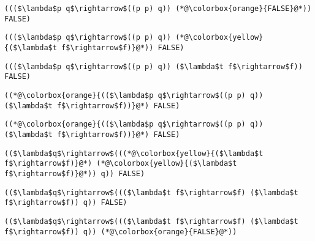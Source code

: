 \documentclass{beamer}
\begin{document}
\begin{frame}[fragile]{\CurrentSection}
\lstset{basicstyle=\ttfamily\small}\lstset{numbers=none}\lstset{language=ML}\begin{lstlisting}
((($\lambda$p q$\rightarrow$((p p) q)) (*@\colorbox{orange}{FALSE}@*)) FALSE)
\end{lstlisting}
\pause\lstset{language=ML}\begin{lstlisting}
((($\lambda$p q$\rightarrow$((p p) q)) (*@\colorbox{yellow}{($\lambda$t f$\rightarrow$f)}@*)) FALSE)
\end{lstlisting}

\end{frame}

\begin{frame}[fragile]{\CurrentSection}
\lstset{basicstyle=\ttfamily\small}\lstset{numbers=none}\lstset{language=ML}\begin{lstlisting}
((($\lambda$p q$\rightarrow$((p p) q)) ($\lambda$t f$\rightarrow$f)) FALSE)
\end{lstlisting}
\pause\lstset{language=ML}\begin{lstlisting}
((*@\colorbox{orange}{(($\lambda$p q$\rightarrow$((p p) q)) ($\lambda$t f$\rightarrow$f))}@*) FALSE)
\end{lstlisting}

\end{frame}

\begin{frame}[fragile]{\CurrentSection}
\lstset{basicstyle=\ttfamily\small}\lstset{numbers=none}\lstset{language=ML}\begin{lstlisting}
((*@\colorbox{orange}{(($\lambda$p q$\rightarrow$((p p) q)) ($\lambda$t f$\rightarrow$f))}@*) FALSE)
\end{lstlisting}
\pause\lstset{language=ML}\begin{lstlisting}
(($\lambda$q$\rightarrow$(((*@\colorbox{yellow}{($\lambda$t f$\rightarrow$f)}@*) (*@\colorbox{yellow}{($\lambda$t f$\rightarrow$f)}@*)) q)) FALSE)
\end{lstlisting}

\end{frame}

\begin{frame}[fragile]{\CurrentSection}
\lstset{basicstyle=\ttfamily\small}\lstset{numbers=none}\lstset{language=ML}\begin{lstlisting}
(($\lambda$q$\rightarrow$((($\lambda$t f$\rightarrow$f) ($\lambda$t f$\rightarrow$f)) q)) FALSE)
\end{lstlisting}
\pause\lstset{language=ML}\begin{lstlisting}
(($\lambda$q$\rightarrow$((($\lambda$t f$\rightarrow$f) ($\lambda$t f$\rightarrow$f)) q)) (*@\colorbox{orange}{FALSE}@*))
\end{lstlisting}

\end{frame}
\end{document}
